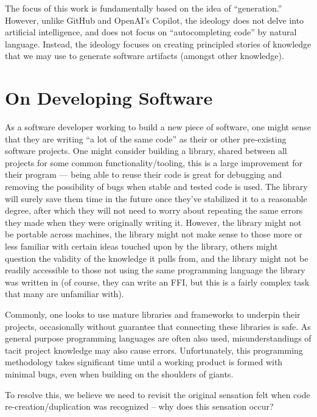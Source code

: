 The focus of this work is fundamentally based on the idea of ``generation.''
However, unlike GitHub and OpenAI's Copilot, the ideology does not delve into
artificial intelligence, and does not focus on ``autocompleting code'' by
natural language. Instead, the ideology focuses on creating principled stories
of knowledge that we may use to generate software artifacts (amongst other
knowledge).

\section{On Developing Software}\label{sec:idlgy:on_developing_software}

As a software developer working to build a new piece of software, one might
sense that they are writing ``a lot of the same code'' as their or other
pre-existing software projects. One might consider building a library, shared
between all projects for some common functionality/tooling, this is a large
improvement for their program --- being able to reuse their code is great for
debugging and removing the possibility of bugs when stable and tested code is
used. The library will surely save them time in the future once they've
stabilized it to a reasonable degree, after which they will not need to worry
about repeating the same errors they made when they were originally writing it.
However, the library might not be portable across machines, the library might
not make sense to those more or less familiar with certain ideas touched upon by
the library, others might question the validity of the knowledge it pulls from,
and the library might not be readily accessible to those not using the same
programming language the library was written in (of course, they can write an
FFI, but this is a fairly complex task
that many are unfamiliar with).

Commonly, one looks to use mature libraries and frameworks to underpin their
projects, occasionally without guarantee that connecting these libraries is
safe. As general purpose programming languages are often also used,
misunderstandings of tacit project knowledge may also cause errors.
Unfortunately, this programming methodology takes significant time until a
working product is formed with minimal bugs, even when building on the shoulders
of giants.

To resolve this, we believe we need to revisit the original sensation felt when
code re-creation/duplication was recognized -- why does this sensation occur?


